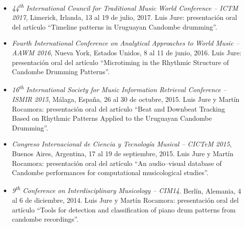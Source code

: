 \begin{itemize}
\item[]	%
\emph{44\textsuperscript{th} International Council for Traditional Music World Conference -- ICTM 2017},
Limerick, Irlanda, 13 al 19 de julio, 2017.
Luis Jure: presentación oral del artículo ``Timeline patterns in Uruguayan Candombe drumming''.

\item[] 	%
\emph{Fourth International Conference on Analytical Approaches
to World Music -- AAWM 2016},
Nueva York, Estados Unidos, 8 al 11 de junio, 2016.
Luis Jure: presentación oral del artículo ``Microtiming in the Rhythmic
Structure of Candombe Drumming Patterns''.

\item[] 	%
\emph{16\textsuperscript{th} International Society for Music Information Retrieval
Conference -- ISMIR 2015}, Málaga, España, 26 al 30 de octubre, 2015.
Luis Jure y Martín Rocamora: presentación oral del artículo
``Beat and Downbeat Tracking Based on Rhythmic Patterns
Applied to the Uruguayan Candombe Drumming''.

\item[]	%
\emph{Congreso Internacional de Ciencia y Tecnología Musical -- CICTeM 2015},
Buenos Aires, Argentina, 17 al 19 de septiembre, 2015.
Luis Jure y Martín Rocamora: presentación oral del artículo
``An audio--visual database of Candombe performances for computational
musicological studies''.

\item[]	%
\emph{9\textsuperscript{th} Conference on Interdisciplinary Musicology -- CIM14}.
Berlín, Alemania, 4 al 6 de diciembre, 2014.
Luis Jure y Martín Rocamora: presentación oral del artículo
``Tools for detection and classification of piano drum
patterns from candombe recordings''.

\end{itemize}

